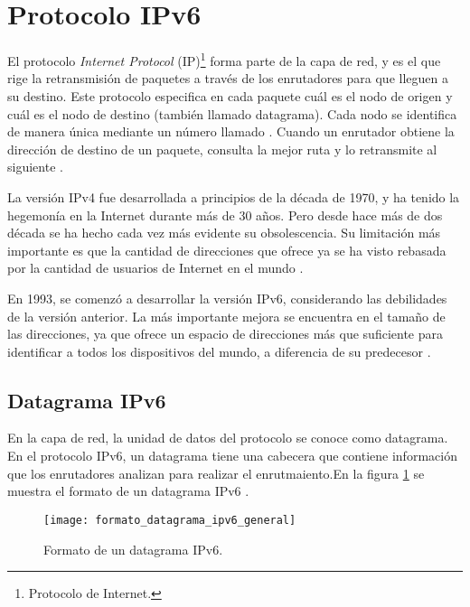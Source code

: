 \section{Protocolo IPv6}
\label{sec:protocolo_ipv6}

El protocolo \textit{Internet Protocol} (IP)\footnote{Protocolo de Internet.}
forma parte de la capa de red, y es el que rige la retransmisión de paquetes
a través de los enrutadores para que lleguen a su destino. Este protocolo
especifica en cada paquete cuál es el nodo de origen y cuál es el nodo de
destino (también llamado datagrama). Cada nodo se identifica de manera única
mediante un número llamado . Cuando un enrutador obtiene
la dirección de destino de un paquete, consulta la mejor ruta y lo retransmite
al siguiente \cite{Kurose2013}.

La versión IPv4 fue desarrollada a principios de la década de 1970, y ha tenido
la hegemonía en la Internet durante más de 30 años. Pero desde hace más de dos
década se ha hecho cada vez más evidente su obsolescencia. Su limitación más
importante es que la cantidad de direcciones que ofrece ya se ha visto rebasada
por la cantidad de usuarios de Internet en el mundo \cite{Hagen2006}.

En 1993, se comenzó a desarrollar la versión IPv6, considerando las debilidades
de la versión anterior. La más importante mejora se encuentra en el tamaño de
las direcciones, ya que ofrece un espacio de direcciones más que suficiente
para identificar a todos los dispositivos del mundo, a diferencia de su
predecesor \cite{Hagen2006}.

\subsection{Datagrama IPv6}
\label{subsec:datagrama_ipv6}

En la capa de red, la unidad de datos del protocolo se conoce como datagrama.
En el protocolo IPv6, un datagrama tiene una cabecera que contiene información
que los enrutadores analizan para realizar el enrutmaiento.En la figura
\ref{fig:formato_datagrama_ipv6_general} se muestra el formato de un datagrama
IPv6 \cite{Hagen2006}.

\begin{figure}[th]
\centering
\texttt{[image: formato\_datagrama\_ipv6\_general]}
\decoRule
\caption[Datagrama IPv6]{Formato de un datagrama IPv6.}
\label{fig:formato_datagrama_ipv6_general}
\end{figure}

